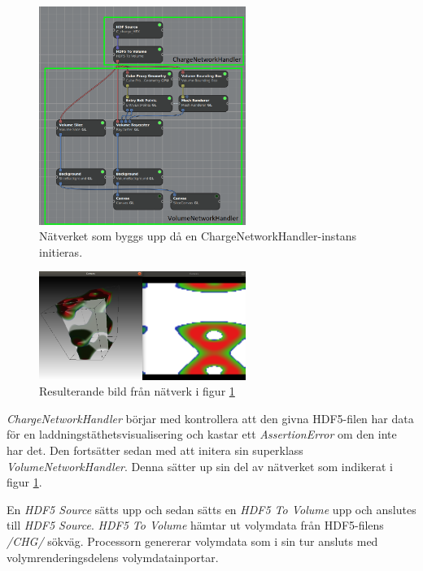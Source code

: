 \documentclass[10pt,oneside,swedish]{article}
\begin{document}
\begin{figure}[H]
\centering
\includegraphics[width=0.60000\textwidth]{Images/ChargeNetworkHandler.png}
\caption{Nätverket som byggs upp då en ChargeNetworkHandler-instans
initieras.}
\label{fig:ChargeNetworkHandler}
\end{figure}

\begin{figure}[H]
\centering
\includegraphics[width=0.60000\textwidth]{Images/charge.png}
\caption{Resulterande bild från nätverk i figur \ref{fig:ChargeNetworkHandler}}
\end{figure}

\emph{ChargeNetworkHandler} börjar med kontrollera att den givna
HDF5-filen har data för en laddningstäthetsvisualisering och kastar ett
\emph{AssertionError} om den inte har det. Den fortsätter sedan med att
initera sin superklass \emph{VolumeNetworkHandler}. Denna sätter up sin
del av nätverket som indikerat i figur \ref{fig:ChargeNetworkHandler}.

En \emph{HDF5 Source} sätts upp och sedan sätts en \emph{HDF5 To Volume}
upp och anslutes till \emph{HDF5 Source}. \emph{HDF5 To Volume} hämtar
ut volymdata från HDF5-filens \emph{/CHG/} sökväg. Processorn genererar
volymdata som i sin tur ansluts med volymrenderingsdelens
volymdatainportar.
\end{document}
